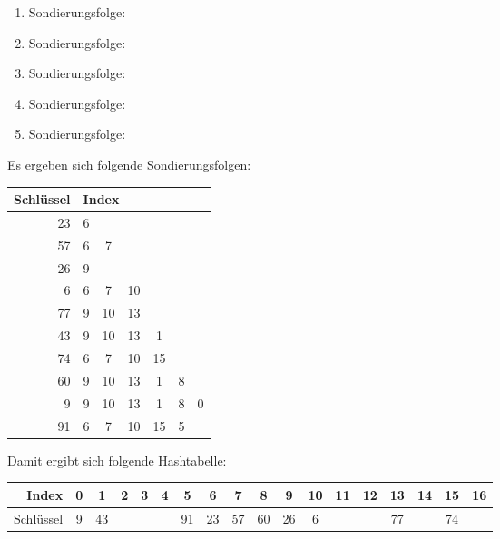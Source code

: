 \documentclass{lehramt-informatik}
\begin{document}
\begin{enumerate}
\begin{enumerate}
\begin{antwort}
\begin{enumerate}
\item Sondierungsfolge: \\

\item Sondierungsfolge: \\

\item Sondierungsfolge: \\

\item Sondierungsfolge: \\

\item Sondierungsfolge: \\
\end{enumerate}

\bigskip

Es ergeben sich folgende Sondierungsfolgen:

{
\setlength{\tabcolsep}{2pt}
\footnotesize

\begin{tabular}{r|cccccc}
Schlüssel & \multicolumn{6}{l}{Index}\\\hline
23 & 6\\
57 & 6 & 7\\
26 & 9\\
6  & 6 & 7 & 10 \\
77 & 9 & 10 & 13 \\
43 & 9 & 10 & 13 & 1 \\
74 & 6 & 7 & 10 & 15\\
60 & 9 & 10 & 13 & 1 & 8 \\
9  & 9 & 10 & 13 & 1 & 8 & 0\\
91 & 6 & 7 & 10 & 15 & 5\\
\end{tabular}

Damit ergibt sich folgende Hashtabelle:

\begin{tabular}{r|ccccccccccccccccc}
Index & 0 & 1 & 2 & 3 & 4 & 5 & 6 & 7 & 8 & 9 & 10 & 11 & 12 & 13 & 14 & 15 & 16 \\\hline
Schlüssel &9&43&&&&91&23&57&60&26&6&&&77&&74&\\
\end{tabular}
}
\end{antwort}
\end{enumerate}
\end{enumerate}
\end{document}

